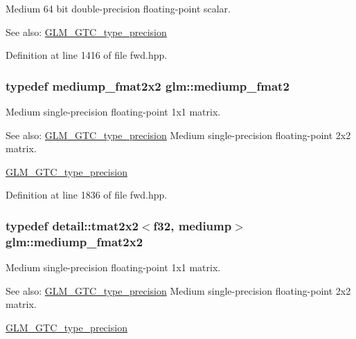 Medium 64 bit double-precision floating-point scalar. \begin{Desc}
\item[See also:]\hyperlink{group__gtc__type__precision}{GLM\_\-GTC\_\-type\_\-precision} \end{Desc}


Definition at line 1416 of file fwd.hpp.\hypertarget{group__gtc__type__precision_g5b9de77ef7403ffc972700219eca5450}{
\subsubsection[mediump\_\-fmat2]{\setlength{\rightskip}{0pt plus 5cm}typedef mediump\_\-fmat2x2 {\bf glm::mediump\_\-fmat2}}}
\label{group__gtc__type__precision_g5b9de77ef7403ffc972700219eca5450}


Medium single-precision floating-point 1x1 matrix. \begin{Desc}
\item[See also:]\hyperlink{group__gtc__type__precision}{GLM\_\-GTC\_\-type\_\-precision} Medium single-precision floating-point 2x2 matrix. 

\hyperlink{group__gtc__type__precision}{GLM\_\-GTC\_\-type\_\-precision} \end{Desc}


Definition at line 1836 of file fwd.hpp.\hypertarget{group__gtc__type__precision_ge9af1d96efbaeeb5c5edd9c7b0a24fa5}{
\subsubsection[mediump\_\-fmat2x2]{\setlength{\rightskip}{0pt plus 5cm}typedef detail::tmat2x2$<$f32, mediump$>$ {\bf glm::mediump\_\-fmat2x2}}}
\label{group__gtc__type__precision_ge9af1d96efbaeeb5c5edd9c7b0a24fa5}


Medium single-precision floating-point 1x1 matrix. \begin{Desc}
\item[See also:]\hyperlink{group__gtc__type__precision}{GLM\_\-GTC\_\-type\_\-precision} Medium single-precision floating-point 2x2 matrix. 

\hyperlink{group__gtc__type__precision}{GLM\_\-GTC\_\-type\_\-precision} \end{Desc}


